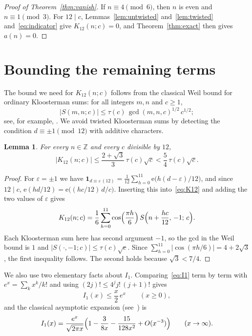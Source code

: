 \documentclass[11pt]{amsart}
\numberwithin{equation}{section}
\newtheorem{lemma}[theorem]{Lemma}
\theoremstyle{definition}
\theoremstyle{remark}
\newcommand{\e}{\mathrm{e}}
\newcommand{\Z}{\mathbb{Z}}
\begin{document}
\begin{proof}[Proof of Theorem~\ref{thm:vanish}]
If $n\equiv4\pmod6$, then $n$ is even and $n\equiv1\pmod3$. For $12\mid c$, Lemmas~\ref{lem:untwisted} and~\ref{lem:twisted} and~\eqref{eq:indicator} give $K_{12}(n;c)=0$, and Theorem~\ref{thm:exact} then gives $a(n)=0$.
\end{proof}

\section{Bounding the remaining terms}\label{sec:tail}

The bound we need for $K_{12}(n;c)$ follows from the classical Weil bound for ordinary Kloosterman sums: for all integers $m,n$ and $c\ge1$,
\[
|S(m,n;c)|\le\tau(c)\,\gcd(m,n,c)^{1/2}\,c^{1/2};
\]
see, for example, \cite[Corollary~11.12]{IK}. We avoid twisted Kloosterman sums by detecting the condition $d\equiv\pm1\pmod{12}$ with additive characters.

\begin{lemma}\label{lem:weil}
For every $n\in\Z$ and every $c$ divisible by $12$,
\begin{equation}\label{eq:Kbound}
|K_{12}(n;c)|\le\frac{2+\sqrt3}{3}\,\tau(c)\sqrt c<\frac54\,\tau(c)\sqrt c.
\end{equation}
\end{lemma}

\begin{proof}
For $\varepsilon=\pm1$ we have $\mathbf 1_{d\equiv\varepsilon\,(12)}=\frac1{12}\sum_{h=0}^{11}\e\bigl(h(d-\varepsilon)/12\bigr)$, and since $12\mid c$, $\e(hd/12)=\e\bigl((hc/12)\,d/c\bigr)$. Inserting this into~\eqref{eq:K12} and adding the two values of $\varepsilon$ gives
\begin{equation}\label{eq:additive}
K_{12}(n;c)=\frac16\sum_{h=0}^{11}\cos\Bigl(\frac{\pi h}{6}\Bigr)\,S\Bigl(n+\frac{hc}{12},\,-1;\,c\Bigr).
\end{equation}
Each Kloosterman sum here has second argument $-1$, so the gcd in the Weil bound is $1$ and $|S(\cdot,-1;c)|\le\tau(c)\sqrt c$. Since $\sum_{h=0}^{11}|\cos(\pi h/6)|=4+2\sqrt3$, the first inequality follows. The second holds because $\sqrt3<7/4$.
\end{proof}

We also use two elementary facts about $I_1$. Comparing~\eqref{eq:I1} term by term with $e^x=\sum_k x^k/k!$ and using $(2j)!\le 4^j j!\,(j+1)!$ gives
\begin{equation}\label{eq:I1upper}
I_1(x)\le\frac x2\,e^x\qquad(x\ge0),
\end{equation}
and the classical asymptotic expansion (see~\cite[\S4.12]{AAR}) is
\begin{equation}\label{eq:I1asymp}
I_1(x)=\frac{e^x}{\sqrt{2\pi x}}\Bigl(1-\frac3{8x}-\frac{15}{128x^2}+O(x^{-3})\Bigr)\qquad(x\to\infty).
\end{equation}
\end{document}
